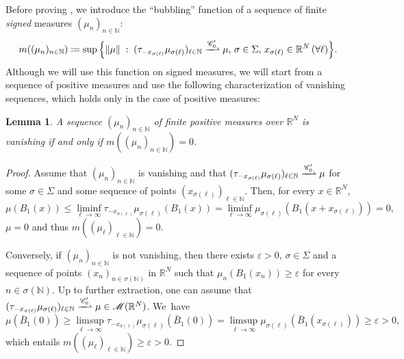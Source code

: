 \documentclass[10pt]{amsart}
\theoremstyle{plain}
\newtheorem{lemma}[theorem]{Lemma}
\theoremstyle{definition}
\newcommand{\N}{\mathbb{N}}
\newcommand{\R}{\mathbb{R}}
\newcommand{\Cspace}{\mathscr{C}}
\newcommand{\Mspace}{\mathscr{M}}
\newcommand{\eps}{\varepsilon}
\newcommand{\st}{\;:\;}
\DeclarePairedDelimiter{\norm}{\lVert}{\rVert}
\newcommand{\mweakto}{\xrightharpoonup{\Cspace_0'}}
\begin{document}
Before proving , we introduce the \enquote{bubbling} function of a sequence of finite \emph{signed} measures \((\mu_n)_{n\in\N}\):\vspace*{-3pt}
\begin{equation}
m((\mu_n)_{n\in\N})\coloneqq\sup\Big\{ \norm{\mu} \st (\tau_{-x_{\sigma(\ell)}}\mu_{\sigma(\ell)})_{\ell\in\N} \mweakto \mu,\, \sigma \in \Sigma,\, x_{\sigma(\ell)} \in \R^N\, (\forall \ell) \Big\}.
\end{equation}
Although we will use this function on signed measures, we will start from a sequence of positive measures and use the following characterization of vanishing sequences, which holds only in the case of positive measures:
\begin{lemma}\label{concentrationProperties}
A sequence \((\mu_n)_{n\in\N}\) of finite positive measures over $\R^N$ is vanishing if and only if \(m((\mu_n)_{n\in\N})=0\).
\end{lemma}
\begin{proof}
Assume that \((\mu_n)_{n\in\N}\) is vanishing and that \((\tau_{-x_{\sigma(\ell)}}\mu_{\sigma(\ell)})_{\ell\in\N} \mweakto \mu\) for some \(\sigma \in \Sigma\) and some sequence of points \((x_{\sigma(\ell)})_{\ell\in\N}\). Then, for every \(x\in\R^N\),\vspace*{-3pt}
\[
\mu(B_1(x))\le\liminf_{\ell\to\infty}\tau_{-x_{\sigma(\ell)}}\mu_{\sigma(\ell)}(B_1(x))=\liminf_{\ell\to\infty}\mu_{\sigma(\ell)}(B_1(x+x_{\sigma(\ell)}))=0,
\]
\ie \(\mu=0\) and thus \(m((\mu_\ell)_{\ell\in\N})=0\).

Conversely, if \((\mu_n)_{n\in\N}\) is not vanishing, then there exists \(\eps>0\), \(\sigma\in\Sigma\) and a sequence of points \((x_n)_{n\in\sigma(\N)}\) in \(\R^N\) such that \(\mu_n(B_1(x_n))\ge\eps\) for every \(n\in\sigma(\N)\). Up to further extraction, one can assume that \((\tau_{-x_{\sigma(\ell)}}\mu_{\sigma(\ell)})_{\ell\in\N} \mweakto\mu\in\Mspace(\R^N)\). We~have\vspace*{-3pt}
\[
\mu(\bar B_1(0))\ge\limsup_{\ell\to\infty}\tau_{-x_{\sigma(\ell)}}\mu_{\sigma(\ell)}(\bar B_1(0))=\limsup_{\ell\to\infty}\mu_{\sigma(\ell)}(\bar B_1(x_{\sigma(\ell)}))\ge\eps>0,
\]
which entails \(m((\mu_\ell)_{\ell\in\N})\ge\eps>0\).
\end{proof}
\end{document}
